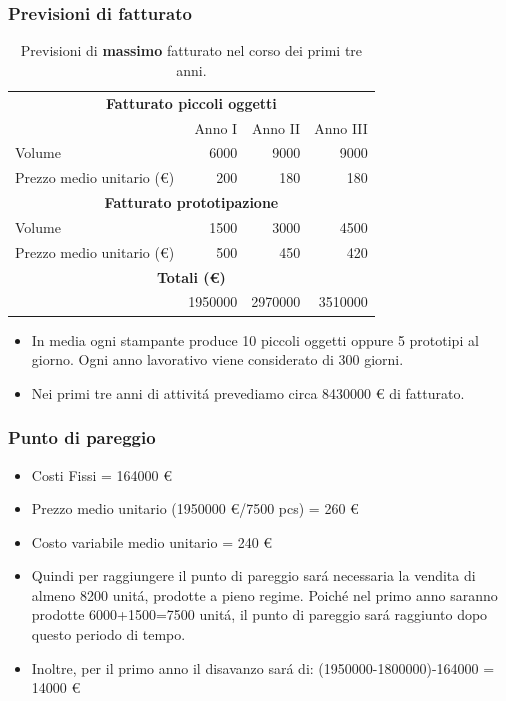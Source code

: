 \documentclass{beamer}
\begin{document}
    \begin{frame}
        \frametitle{Previsioni di fatturato}
            \begin{table}[h]
                \begin{tabular}{lrrr}
                    \hline
                    \multicolumn{4}{c}{\textbf{Fatturato piccoli oggetti}} \\
                    \cline{1-4}
                    & Anno I & Anno II & Anno III \\ \hline
                    Volume & 6000 & 9000 & 9000 \\
                    Prezzo medio unitario (\euro{}) & 200 & 180 & 180 \\ 
                    \hline
                    \multicolumn{4}{c}{\textbf{Fatturato prototipazione}} \\
                    \cline{1-4}
                    Volume & 1500 & 3000 & 4500 \\
                    Prezzo medio unitario (\euro{}) & 500 & 450 & 420 \\
                    \hline
                    \multicolumn{4}{c}{\textbf{Totali (\euro{})}} \\
                    \cline{1-4}
                    & 1950000 & 2970000 & 3510000 \\
                    \hline
                \end{tabular}
                \caption{Previsioni di \textbf{massimo} fatturato nel corso dei 
primi tre anni.}
            \end{table}
            \begin{itemize}
                \item In media ogni stampante produce 10 piccoli oggetti oppure 
5 prototipi al giorno. Ogni anno lavorativo viene considerato di 300 giorni.
                \item Nei primi tre anni di attivit\'a prevediamo circa 
8430000 \euro{} di fatturato.
            \end{itemize}
    \end{frame}

    \begin{frame}
        \frametitle{Punto di pareggio}
            \begin{itemize}
                \item Costi Fissi = 164000 \euro{}
                \item Prezzo medio unitario (1950000 \euro{}/7500 pcs) = 260 \euro{}
                \item Costo variabile medio unitario = 240 \euro{}
                \item Quindi per raggiungere il punto di pareggio sar\'a 
necessaria la vendita di almeno 8200 unit\'a, prodotte a 
pieno regime. Poich\'e nel primo anno saranno prodotte 6000+1500=7500 unit\'a, 
il punto di pareggio sar\'a raggiunto dopo questo periodo di tempo.
                \item Inoltre, per il primo anno il disavanzo sar\'a di: 
(1950000-1800000)-164000 = 14000 \euro{}
            \end{itemize}            
    \end{frame}
\end{document}
